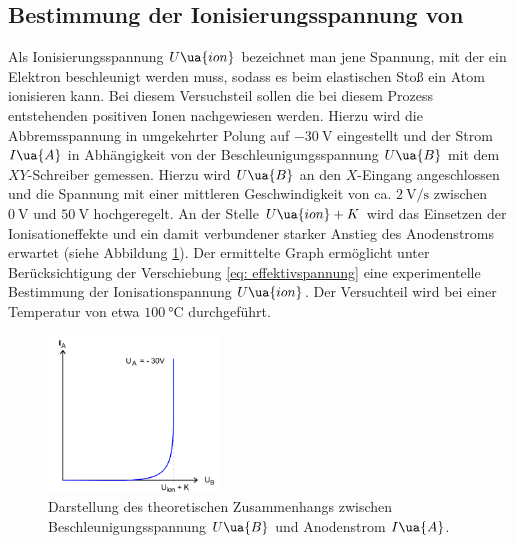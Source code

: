 \subsection{Bestimmung der Ionisierungsspannung von }
Als Ionisierungsspannung $U\ua{ion}$ bezeichnet man jene Spannung, mit der ein Elektron beschleunigt werden
muss, sodass es beim elastischen Stoß ein Atom ionisieren kann. Bei diesem Versuchsteil sollen die bei diesem
Prozess entstehenden positiven Ionen nachgewiesen werden. Hierzu wird die Abbremsspannung in umgekehrter Polung
auf $\SI{-30}{\volt}$ eingestellt und der Strom $I\ua{A}$ in Abhängigkeit von der Beschleunigungsspannung $U\ua{B}$
mit dem $XY$-Schreiber gemessen. Hierzu wird $U\ua{B}$ an den $X$-Eingang angeschlossen und die Spannung mit einer %
mittleren Geschwindigkeit von ca. $\SI{2}{\volt \per\second}$ zwischen $\SI{0}{\volt}$ und $\SI{50}{\volt}$ hochgeregelt.
An der Stelle $U\ua{ion} + K$ wird das Einsetzen der Ionisationeffekte und ein damit verbundener starker Anstieg
des Anodenstroms erwartet (siehe Abbildung \ref{fig: theo_U_ion}).
Der ermittelte Graph ermöglicht unter Berücksichtigung der Verschiebung \ref{eq: effektivspannung} eine
experimentelle Bestimmung der Ionisationspannung $U\ua{ion}$. Der Versuchteil wird bei einer Temperatur von etwa $\SI{100}{\celsius}$
durchgeführt.
\begin{figure}[H]
  \centering
  \includegraphics[width = 0.4\textwidth]{pics/ionisationsspannung.png}
  \caption{Darstellung des theoretischen Zusammenhangs zwischen Beschleunigungsspannung $U\ua{B}$ und Anodenstrom $I\ua{A}$\cite{anleitung601}.}
  \label{fig: theo_U_ion}
\end{figure}
